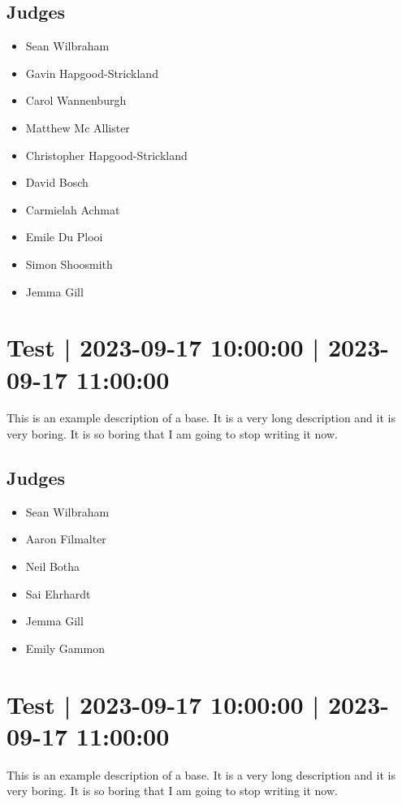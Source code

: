 \documentclass[10pt]{article}
\begin{document}
	\subsection*{Judges}
	\begin{itemize}

			\item Sean Wilbraham
			\item Gavin Hapgood-Strickland
			\item Carol Wannenburgh
			\item Matthew Mc Allister
			\item Christopher Hapgood-Strickland
			\item David Bosch
			\item Carmielah Achmat
			\item Emile Du Plooi
			\item Simon Shoosmith
			\item Jemma Gill
		\end{itemize}

			\setcounter{section}{36}
	\section{Test | 2023-09-17 10:00:00 | 2023-09-17 11:00:00}
	This is an example description of a base. It is a very long description and it is very boring. It is so boring that I am going to stop writing it now.

	\subsection*{Judges}
	\begin{itemize}

			\item Sean Wilbraham
			\item Aaron Filmalter
			\item Neil Botha
			\item Sai Ehrhardt
			\item Jemma Gill
			\item Emily Gammon
		\end{itemize}

			\setcounter{section}{37}
	\section{Test | 2023-09-17 10:00:00 | 2023-09-17 11:00:00}
	This is an example description of a base. It is a very long description and it is very boring. It is so boring that I am going to stop writing it now.
\end{document}
